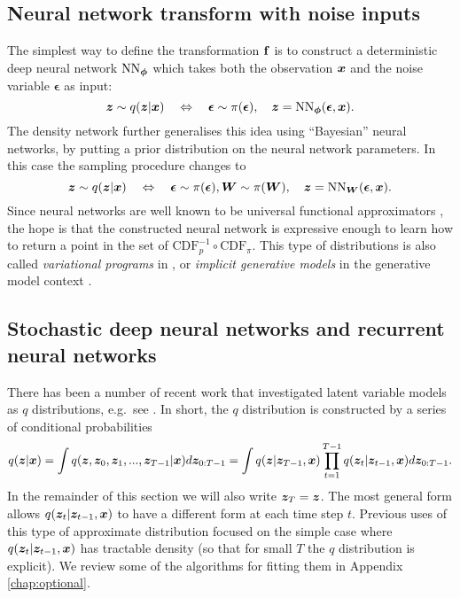 \subsection{Neural network transform with noise inputs}
The simplest way to define the transformation $\mathbf{f}$ is to construct a deterministic deep neural network $\text{NN}_{\bm{\phi}}$ which takes both the observation $\bm{x}$ and the noise variable $\bm{\epsilon}$ as input:
\begin{equation}
\bm{z} \sim q(\bm{z} | \bm{x}) \quad \Leftrightarrow \quad \bm{\epsilon} \sim \pi(\bm{\epsilon}), \quad \bm{z} = \text{NN}_{\bm{\phi}} (\bm{\epsilon}, \bm{x}).
\end{equation}
The density network \citep{mackay:density1999} further generalises this idea using ``Bayesian'' neural networks, by putting a prior distribution on the neural network parameters. In this case the sampling procedure changes to
\begin{equation}
\bm{z} \sim q(\bm{z} | \bm{x}) \quad \Leftrightarrow \quad \bm{\epsilon} \sim \pi(\bm{\epsilon}), \bm{W} \sim \pi(\bm{W}), \quad \bm{z} = \text{NN}_{\bm{W}} (\bm{\epsilon}, \bm{x}).
\end{equation}
%
Since neural networks are well known to be universal functional approximators \citep{hornik:universal_approx1989}, the hope is that the constructed neural network is expressive enough to learn how to return a point in the set of $ \text{CDF}_{p}^{-1} \circ \text{CDF}_{\pi}$. This type of distributions is also called \emph{variational programs} in \citep{ranganath:ovi2016}, or \emph{implicit generative models} in the generative model context \citep{mohamed:gan2016}. 

\subsection{Stochastic deep neural networks and recurrent neural networks}
There has been a number of recent work that investigated latent variable models as $q$ distributions, e.g.~see \cite{salimans:mcmcvi2015, ranganath:hvm2016, tran:vgp2016, maaloe:agdm2016}. In short, the $q$ distribution is constructed by a series of conditional probabilities
\begin{equation}
q(\bm{z} | \bm{x}) = \int q(\bm{z}, \bm{z}_0, \bm{z}_1, ..., \bm{z}_{T-1} | \bm{x}) d\bm{z}_{0:T-1} = \int q(\bm{z} | \bm{z}_{T-1}, \bm{x}) \prod_{t=1}^{T-1} q(\bm{z}_{t} | \bm{z}_{t-1}, \bm{x}) d\bm{z}_{0:T-1}.
\end{equation}
In the remainder of this section we will also write $\bm{z}_T = \bm{z}$. The most general form allows $q(\bm{z}_{t} | \bm{z}_{t-1}, \bm{x})$ to have a different form at each time step $t$. Previous uses of this type of approximate distribution focused on the simple case where $q(\bm{z}_{t} | \bm{z}_{t-1}, \bm{x})$ has tractable density (so that for small $T$ the $q$ distribution is explicit). We review some of the algorithms for fitting them in Appendix \ref{chap:optional}.

